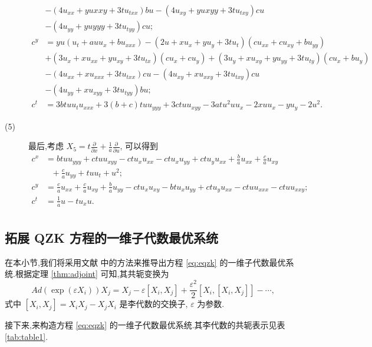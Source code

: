 \begin{description}
\begin{equation*}
\begin{aligned}
&-(4u_{xx}+yu{xxy}+3tu_{txx})bu-(4u_{xy}+yu{xyy}+3tu_{txy})cu\\
&-(4u_{yy}+yu{yyy}+3tu_{tyy})cu;\\
c^{y}&=yu(u_{t}+auu_{x}+bu_{xxx})-(2u+xu_{x}+yu_{y}+3tu_{t})(cu_{xx}+cu_{xy}+bu_{yy})\\
&+(3u_{x}+xu_{xx}+yu_{xy}+3tu_{tx})(cu_{x}+cu_{y})+(3u_{y}+xu_{xy}+yu_{yy}+3tu_{ty})(cu_{x}+bu_{y})\\
&-(4u_{xx}+xu_{xxx}+3tu_{txx})cu-(4u_{xy}+xu_{xxy}+3tu_{txy})cu\\
&-(4u_{yy}+xu_{xyy}+3tu_{tyy})bu;\\
c^{t}&=3btuu_{t}u_{xxx}+3(b+c)tuu_{yyy}+3ctuu_{xyy}-3atu^2uu_x-2xuu_x-yu_y-2u^2.
\end{aligned}
\end{equation*}

\item[(5)] 最后,考虑 $X_{5}=t\frac{\partial}{\partial x}+\frac{1}{a}\frac{\partial}{\partial u}$, 可以得到
\begin{equation*}
\begin{aligned}
c^{x}&=btuu_{yyy}+ctuu_{xyy}-ctu_{x}u_{xx}-ctu_{x}u_{yy}+ctu_{y}u_{xx}+\frac{b}{a}u_{xx}+\frac{c}{a}u_{xy}\\
&~~~+\frac{c}{a}u_{yy}+tuu_t+u^2;\\
c^{y}&=\frac{c}{a}u_{xx}+\frac{c}{a}u_{xy}+\frac{b}{a}u_{yy}-ctu_{x}u_{xy}-btu_{x}u_{yy}+ctu_{y}u_{xx}-ctuu_{xxx}-ctuu_{xxy};\\
c^{t}&=\frac{1}{a}u-tu_{x}u.\\
\end{aligned}
\end{equation*}
\end{description}

\subsection{拓展 QZK 方程的一维子代数最优系统}\label{sec:05optimal}
在本小节,我们将采用文献 \cite{peter2000sym} 中的方法来推导出方程 \eqref{eq:eqzk} 的一维子代数最优系统.根据定理 \ref{thm:adjoint} 可知,其共轭变换为
\begin{equation*}
	Ad(\exp(\varepsilon X_i))X_j=X_j-\varepsilon[X_i,X_j]+\frac{\varepsilon^2}{2}[X_i,[X_i,X_j]]-\cdots,
\end{equation*}
式中 $[X_i,X_j]=X_iX_j-X_jX_i$ 是李代数的交换子, $\varepsilon$ 为参数.

接下来,来构造方程 \eqref{eq:eqzk} 的一维子代数最优系统.其李代数的共轭表示见表 \ref{tab:table1}.

